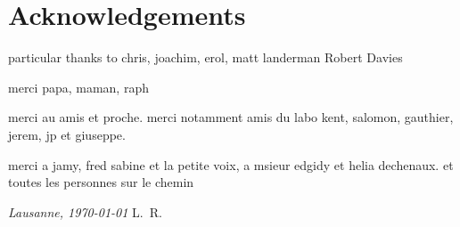 \chapter*{Acknowledgements}


particular thanks to chris, joachim, erol, matt landerman Robert Davies


merci papa, maman, raph

merci au amis et proche. merci notamment amis du labo kent, salomon, gauthier, jerem, jp et giuseppe.

merci a jamy, fred sabine et la petite voix, a msieur edgidy et helia dechenaux. et toutes les personnes sur le chemin

\bigskip
 
\noindent\textit{Lausanne, \today}
\hfill L.~R.
